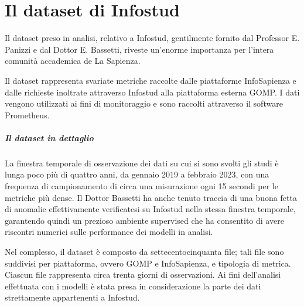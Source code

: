     

\chapter{Il dataset di Infostud} \label{cap2}
    Il dataset preso in analisi, relativo a Infostud, gentilmente fornito dal Professor E. Panizzi e dal Dottor 
    E. Bassetti, riveste un'enorme importanza per l'intera comunità accademica de La Sapienza.

    Il dataset rappresenta svariate 
    metriche raccolte dalle piattaforme InfoSapienza e dalle richieste inoltrate attraverso 
    Infostud alla piattaforma esterna GOMP. I dati vengono utilizzati ai fini di monitoraggio e 
    sono raccolti attraverso il software Prometheus. 
    
    \paragraph{Il dataset in dettaglio} La finestra temporale di osservazione dei dati su cui si sono 
    svolti gli studi è lunga poco più di quattro anni, da gennaio 2019 a febbraio 2023, con una frequenza di campionamento di circa 
    una misurazione ogni 15 secondi per le metriche più dense. Il Dottor Bassetti ha anche tenuto traccia di 
    una buona fetta di anomalie effettivamente verificatesi su Infostud nella stessa finestra temporale, 
    garantendo quindi un prezioso ambiente supervised che ha consentito di avere riscontri numerici sulle 
    performance dei modelli in analisi.


    Nel complesso, il dataset è composto da settecentocinquanta file; tali file sono suddivisi per piattaforma, 
    ovvero GOMP e InfoSapienza, e tipologia di metrica. Ciascun file rappresenta 
    circa trenta giorni di osservazioni. Ai fini dell'analisi effettuata con i modelli è stata presa
    in considerazione la parte dei dati strettamente appartenenti a Infostud. 
    
